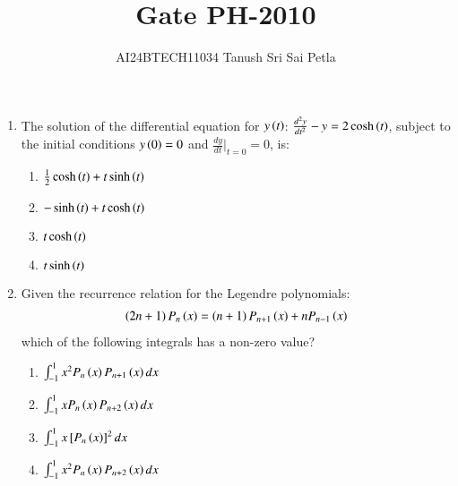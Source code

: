 \documentclass[journal]{IEEEtran}
\begin{document}

\vspace{3cm}


\renewcommand{\thefigure}{\theenumi}
\renewcommand{\thetable}{\theenumi}
\setlength{\intextsep}{10pt} %


\renewcommand{\thetable}{\theenumi}

\title{Gate PH-2010}
\author{AI24BTECH11034 Tanush Sri Sai Petla
}
\maketitle
\renewcommand{\thefigure}{\theenumi}
\renewcommand{\thetable}{\theenumi}
\begin{enumerate}[start=27]
\item The solution of the differential equation for $y\left(t\right)$:  $\frac{d^2y}{dt^2} - y = 2 \cosh\left(t\right)$, subject to the initial conditions $y\left(0\right) = 0$ and $\frac{dy}{dt}|_{t=0} = 0$, is:
\begin{multicols}{2}
\begin{enumerate}
    \item $\frac{1}{2}\cosh\left(t\right) + t\sinh\left(t\right)$
    \item $-\sinh\left(t\right) + t\cosh\left(t\right)$
    \item $t\cosh\left(t\right)$
    \item $t\sinh\left(t\right)$
\end{enumerate}
\end{multicols}

\item Given the recurrence relation for the Legendre polynomials:
\begin{align*}
\left(2n+1\right)P_n\left(x\right) = \left(n+1\right)P_{n+1}\left(x\right) + nP_{n-1}\left(x\right)
\end{align*}
which of the following integrals has a non-zero value?
\begin{multicols}{2}
\begin{enumerate}
    \item $\int_{-1}^{1} x^2 P_n\left(x\right) P_{n+1}\left(x\right) dx$
    \item $\int_{-1}^{1} x P_n\left(x\right) P_{n+2}\left(x\right) dx$
    \item $\int_{-1}^{1} x {}\left[P_n\left(x\right)\right]^2 dx$
    \item $\int_{-1}^{1} x^2 P_n\left(x\right) P_{n+2}\left(x\right) dx$
\end{enumerate}
\end{multicols}


\end{enumerate}
\end{document}
